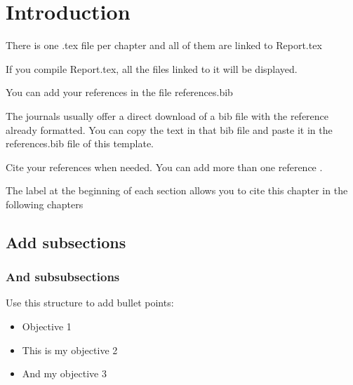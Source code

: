 \section{Introduction}
\label{sec:introduction} 



\vspace{0.1 in}
\noindent

There is one .tex file per chapter and all of them are linked to Report.tex


\vspace{0.1 in}
\noindent
If you compile Report.tex, all the files linked to it will be displayed.

\vspace{0.1 in}
\noindent
You can add your references in the file references.bib

\vspace{0.1 in}
\noindent
The journals usually offer a direct download of a bib file with the reference already formatted. You can copy the text in that bib file and paste it in the references.bib file of this template.

\vspace{0.1 in}
\noindent
Cite your references \cite{UKGovernment} when needed. You can add more than one reference \cite{ZHENG201855, ZHENG201855, Das2010RecyclingVehicles}.

\vspace{0.1 in}
\noindent
The label at the beginning of each section allows you to cite this chapter in the following chapters


\vspace{0.1 in}
\noindent

\subsection{\textbf{Add subsections}}

\vspace{0.1 in}
\noindent

\subsubsection{\textbf{And subsubsections}}


\vspace{0.1 in}
\noindent

Use this structure to add bullet points:

\begin{itemize}

\item Objective 1

\item This is my objective 2

\item And my objective 3

\end{itemize}




